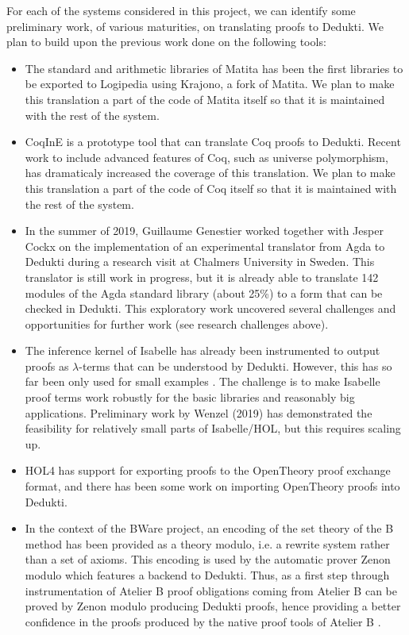 For each of the systems considered in this project, we can
identify some preliminary work, of various maturities,
on translating proofs to Dedukti.
We plan to build upon the previous work done on
the following tools:
\begin{itemize}
\item The standard and arithmetic libraries of Matita has been the
  first libraries to be exported to Logipedia using Krajono, a fork of
  Matita. We plan to make this translation a part of the code of
  Matita itself so that it is maintained with the rest of the system.
\item CoqInE is a prototype tool that can translate Coq proofs to
  Dedukti. Recent work to include advanced features of Coq, such as
  universe polymorphism, has dramaticaly increased the coverage of
  this translation. We plan to make this translation a part of the
  code of Coq itself so that it is maintained with the rest of the
  system.
  \item In the summer of 2019, Guillaume Genestier worked together
  with Jesper Cockx on the implementation of an experimental
  translator from Agda to Dedukti during a research visit at Chalmers
  University in Sweden. This translator is still work in progress, but
  it is already able to translate 142 modules of the Agda standard
  library (about 25\%) to a form that can be checked in Dedukti. This
  exploratory work uncovered several challenges and opportunities for
  further work (see research challenges above).
  \item The inference kernel of Isabelle has already been instrumented
  to output proofs as $\lambda$-terms that can be understood by
  Dedukti. However, this has so far been only used for small examples
  \cite{Berghofer-Nipkow:2000:TPHOL}. The challenge is to make
  Isabelle proof terms work robustly for the basic libraries and
  reasonably big applications.  Preliminary work by Wenzel (2019) has
  demonstrated the feasibility for relatively small parts of
  Isabelle/HOL, but this requires scaling up.
  \item HOL4 has support for exporting proofs to the OpenTheory proof
  exchange format, and there has been some work on importing
  OpenTheory proofs into Dedukti.
  \item In the context of the BWare project, an encoding of the set
  theory of the B method has been provided as a theory modulo, i.e. a
  rewrite system rather than a set of axioms. This encoding is used by
  the automatic prover Zenon modulo which features a backend to
  Dedukti. Thus, as a first step through instrumentation of Atelier B
  proof obligations coming from Atelier B can be proved by
  Zenon modulo producing Dedukti proofs, hence providing a better
  confidence in the proofs produced by the native proof tools of
  Atelier B \cite{Bware}.
\end{itemize}

